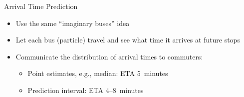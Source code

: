 \documentclass[10pt,t]{beamer}
\begin{document}
{ %
    \begin{frame}[plain]
     \end{frame}
}



\begin{frame}{Arrival Time Prediction}
  \begin{itemize}[<+->]
  \item Use the same ``imaginary buses'' idea

  \item Let each bus (particle) travel and see what time it arrives at future stops

  \item Communicate the distribution of arrival times to commuters:
    \begin{itemize}
    \item Point estimates, e.g., median: ETA 5~minutes
    \item Prediction interval: ETA 4--8~minutes
    \end{itemize}
  \end{itemize}


\end{frame}
\end{document}

